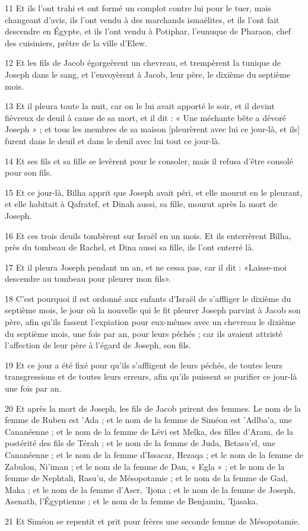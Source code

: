 \par 11 Et ils l'ont trahi et ont formé un complot contre lui pour le tuer, mais changeant d'avis, ils l'ont vendu à des marchands ismaélites, et ils l'ont fait descendre en Égypte, et ils l'ont vendu à Potiphar, l'eunuque de Pharaon, chef des cuisiniers, prêtre de la ville d'Elew.
\par 12 Et les fils de Jacob égorgeèrent un chevreau, et trempèrent la tunique de Joseph dans le sang, et l'envoyèrent à Jacob, leur père, le dixième du septième mois.
\par 13 Et il pleura toute la nuit, car on le lui avait apporté le soir, et il devint fiévreux de deuil à cause de sa mort, et il dit : « Une méchante bête a dévoré Joseph » ; et tous les membres de sa maison [pleurèrent avec lui ce jour-là, et ils] furent dans le deuil et dans le deuil avec lui tout ce jour-là.
\par 14 Et ses fils et sa fille se levèrent pour le consoler, mais il refusa d'être consolé pour son fils.
\par 15 Et ce jour-là, Bilha apprit que Joseph avait péri, et elle mourut en le pleurant, et elle habitait à Qafratef, et Dinah aussi, sa fille, mourut après la mort de Joseph.
\par 16 Et ces trois deuils tombèrent sur Israël en un mois. Et ils enterrèrent Bilha, près du tombeau de Rachel, et Dina aussi sa fille, ils l'ont enterré là.
\par 17 Et il pleura Joseph pendant un an, et ne cessa pas, car il dit : «Laisse-moi descendre au tombeau pour pleurer mon fils».
\par 18 C'est pourquoi il est ordonné aux enfants d'Israël de s'affliger le dixième du septième mois, le jour où la nouvelle qui le fit pleurer Joseph parvint à Jacob son père, afin qu'ils fassent l'expiation pour eux-mêmes avec un chevreau le dixième du septième mois, une fois par an, pour leurs péchés ; car ils avaient attristé l'affection de leur père à l'égard de Joseph, son fils.
\par 19 Et ce jour a été fixé pour qu'ils s'affligent de leurs péchés, de toutes leurs transgressions et de toutes leurs erreurs, afin qu'ils puissent se purifier ce jour-là une fois par an.
\par 20 Et après la mort de Joseph, les fils de Jacob prirent des femmes. Le nom de la femme de Ruben est 'Ada ; et le nom de la femme de Siméon est 'Adlba'a, une Cananéenne ; et le nom de la femme de Lévi est Melka, des filles d'Aram, de la postérité des fils de Térah ; et le nom de la femme de Juda, Betasu'el, une Cananéenne ; et le nom de la femme d'Issacar, Hezaqa ; et le nom de la femme de Zabulon, Ni'iman ; et le nom de la femme de Dan, « Egla » ; et le nom de la femme de Nephtali, Rasu'u, de Mésopotamie ; et le nom de la femme de Gad, Maka ; et le nom de la femme d'Aser, 'Ijona ; et le nom de la femme de Joseph, Asenath, l'Égyptienne ; et le nom de la femme de Benjamin, 'Ijasaka.
\par 21 Et Siméon se repentit et prit pour frères une seconde femme de Mésopotamie.

